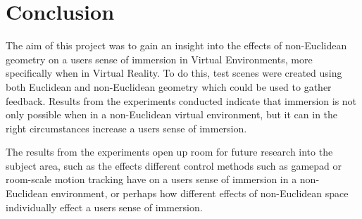 \chapter{Conclusion}
\label{conclusion}

	The aim of this project was to gain an insight into the effects of non-Euclidean geometry on a users sense of immersion in Virtual Environments, more specifically when in Virtual Reality.
	To do this, test scenes were created using both Euclidean and non-Euclidean geometry which could be used to gather feedback. %
	Results from the experiments conducted indicate that immersion is not only possible when in a non-Euclidean virtual environment, but it can in the right circumstances increase a users sense of immersion.


	The results from the experiments open up room for future research into the subject area, such as the effects different control methods such as gamepad or room-scale motion tracking have on a users sense of immersion in a non-Euclidean environment, or perhaps how different effects of non-Euclidean space individually effect a users sense of immersion.

